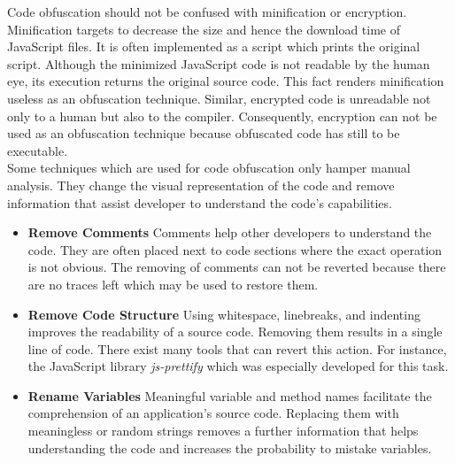 			Code obfuscation should not be confused with minification or encryption. Minification targets to decrease the size and hence the download time of JavaScript files. It is often implemented as a script which prints the original script. Although the minimized JavaScript code is not readable by the human eye, its execution returns the original source code. This fact renders minification useless as an obfuscation technique. Similar, encrypted code is unreadable not only to a human but also to the compiler. Consequently, encryption can not be used as an obfuscation technique because obfuscated code has still to be executable. \\
	
			
	
			
		
		
		
			Some techniques which are used for code obfuscation only hamper manual analysis. They change the visual representation of the code and remove information that assist developer to understand the code's capabilities.
			
			\begin{itemize}
				\item \textbf{Remove Comments} Comments help other developers to understand the code. They are often placed next to code sections where the exact operation is not obvious. The removing of comments can not be reverted because there are no traces left which may be used to restore them.
				\item \textbf{Remove Code Structure} Using whitespace, linebreaks, and indenting improves the readability of a source code. Removing them results in a single line of code. There exist many tools that can revert this action. For instance, the JavaScript library \textit{js-prettify} which was especially developed for this task. %
				\item \textbf{Rename Variables} Meaningful variable and method names facilitate the comprehension of an application's source code. Replacing them with meaningless or random strings removes a further information that helps understanding the code and increases the probability to mistake variables.
			\end{itemize}
			

